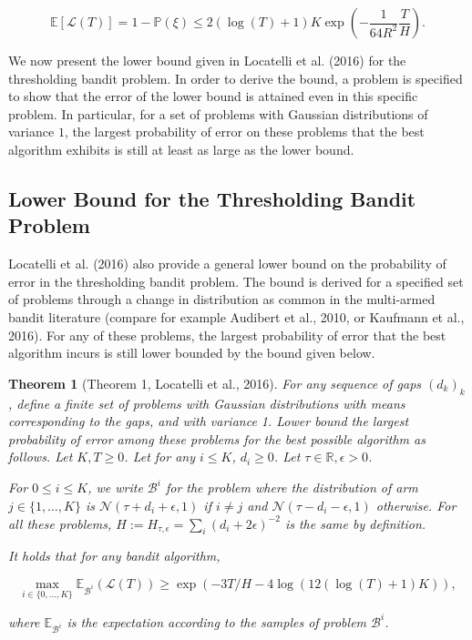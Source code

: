 \documentclass[11pt,]{article}
\newtheorem{theorem}{Theorem}
\begin{document}
\[
\mathbb{E}[\mathcal{L}(T)] = 1 - \mathbb{P}(\xi) \leq 2(\log(T)+1)K \exp(-\frac{1}{64R^2}\frac{T}{H}).
\]

We now present the lower bound given in Locatelli et al. (2016) for the
thresholding bandit problem. In order to derive the bound, a problem is
specified to show that the error of the lower bound is attained even in
this specific problem. In particular, for a set of problems with
Gaussian distributions of variance \(1\), the largest probability of
error on these problems that the best algorithm exhibits is still at
least as large as the lower bound.

\subsection{\texorpdfstring{Lower Bound for the Thresholding Bandit
Problem
\label{sec:LowerBoundLocatelli}}{Lower Bound for the Thresholding Bandit Problem }}\label{lower-bound-for-the-thresholding-bandit-problem}

Locatelli et al. (2016) also provide a general lower bound on the
probability of error in the thresholding bandit problem. The bound is
derived for a specified set of problems through a change in distribution
as common in the multi-armed bandit literature (compare for example
Audibert et al., 2010, or Kaufmann et al., 2016). For any of these
problems, the largest probability of error that the best algorithm
incurs is still lower bounded by the bound given below.

\begin{theorem}[Theorem 1, Locatelli et al., 2016] 
\label{theorem:Locatelli2016Theorem1}
For any sequence of gaps $(d_k)_k$, define a finite set of problems with Gaussian distributions with means corresponding to the gaps, and with variance 1. Lower bound the largest probability of error among these problems for the best possible algorithm as follows. Let $K,T \geq 0$. Let for any $i \leq K$, $d_i \geq 0$. Let $\tau \in \mathbb{R}, \epsilon > 0$.

For $0 \leq i \leq K$, we write $\mathcal{B}^i$ for the problem where the distribution of arm $j \in \{1, \dots, K\}$ is $\mathcal{N}(\tau+d_i+\epsilon, 1)$ if $i \neq j$ and $\mathcal{N}(\tau-d_i-\epsilon, 1)$ otherwise. For all these problems, $H := H_{\tau, \epsilon} = \sum_i (d_i+2\epsilon)^{-2}$ is the same by definition.

It holds that for any bandit algorithm,

\begin{equation*}
\max_{i \in \{0, \dots, K\}} \mathbb{E}_{\mathcal{B}^i} (\mathcal{L}(T)) \geq \exp(-3T/H-4 \log(12(\log(T)+1)K)),
\end{equation*}

where $\mathbb{E}_{\mathcal{B}^i}$ is the expectation according to the samples of problem $\mathcal{B}^i$.
\end{theorem}
\end{document}
